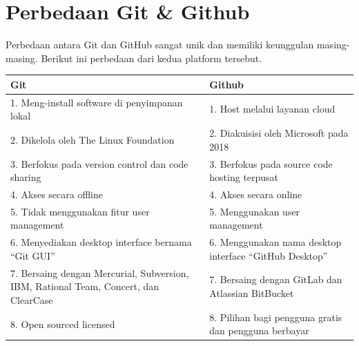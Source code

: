 \section{Perbedaan Git \& Github}
Perbedaan antara Git dan GitHub sangat unik dan memiliki keunggulan masing-masing. Berikut ini perbedaan dari kedua platform tersebut.
\begin{center}
\begin{tabular}{ | m{6cm} | m{6cm} | }
\hline
Git & Github \\
\hline
1. Meng-install software di penyimpanan lokal & 1. Host melalui layanan cloud \\
\hline
2. Dikelola oleh The Linux Foundation & 2. Diakuisisi oleh Microsoft pada 2018 \\
\hline
3. Berfokus pada version control dan code sharing & 3. Berfokus pada source code hosting terpusat \\
\hline
4. Akses secara offline & 4. Akses secara online \\
\hline
5. Tidak menggunakan fitur user management & 5. Menggunakan user management \\
\hline
6. Menyediakan desktop interface bernama “Git GUI” & 6. Menggunakan nama desktop interface “GitHub Desktop” \\
\hline
7. Bersaing dengan Mercurial, Subversion, IBM, Rational Team, Concert, dan ClearCase & 7. Bersaing dengan GitLab dan Atlassian BitBucket \\
\hline
8. Open sourced licensed & 8. Pilihan bagi pengguna gratis dan pengguna berbayar \\
\hline
\end{tabular}
\end{center}


